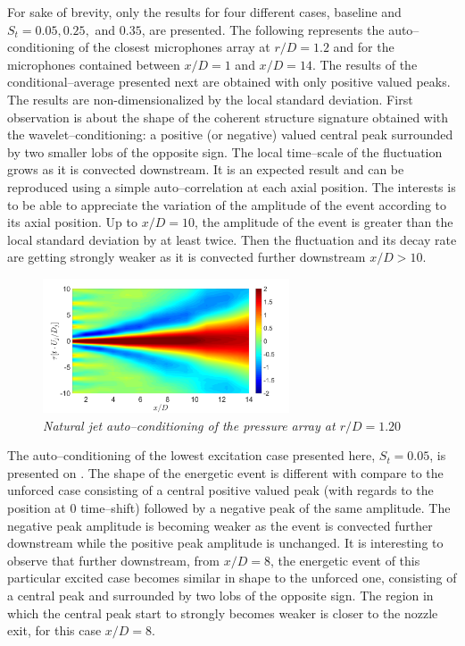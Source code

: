 For sake of brevity, only the results for four different cases, baseline and $S_t = 0.05, 0.25,$ and $0.35$, are presented.
The following  represents the auto--conditioning of the closest microphones array at $r/D = 1.2$ and for the microphones contained between $x/D=1$ and $x/D=14$.
The results of the conditional--average presented next are obtained with only positive valued peaks.
The results are non-dimensionalized by the local standard deviation.
First observation is about the shape of the coherent structure signature obtained with the wavelet--conditioning: a positive (or negative) valued central peak surrounded by two smaller lobs of the opposite sign.
The local time--scale of the fluctuation grows as it is convected downstream.
It is an expected result and can be reproduced using a simple auto--correlation at each axial position.
The interests is to be able to appreciate the variation of the amplitude of the event according to its axial position.
Up to $x/D=10$, the amplitude of the event is greater than the local standard deviation by at least twice.
Then the fluctuation and its decay rate are getting strongly weaker as it is convected further downstream $x/D > 10$. 

\begin{figure}
	\centering
	\includegraphics[width=0.65\textwidth]{Figures/conditioning/autoCondSt0p00.png}
	\caption{\textit{Natural jet auto--conditioning of the pressure array at $r/D = 1.20$}}
	\label{fig:autoCondSt0p00}
\end{figure}

The auto--conditioning of the lowest excitation case presented here, $S_t = 0.05$, is presented on .
The shape of the energetic event is different with compare to the unforced case consisting of a central positive valued peak (with regards to the position at $0$ time--shift) followed by a negative peak of the same amplitude.
The negative peak amplitude is becoming weaker as the event is convected further downstream while the positive peak amplitude is unchanged.
It is interesting to observe that further downstream, from $x/D=8$, the energetic event of this particular excited case becomes similar in shape to the unforced one, consisting of a central peak and surrounded by two lobs of the opposite sign.
The region in which the central peak start to strongly becomes weaker is closer to the nozzle exit, for this case $x/D = 8$. 

